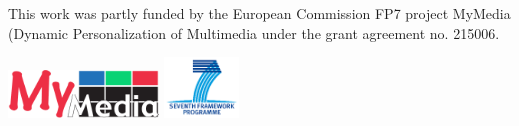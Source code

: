 \documentclass[a4paper, foldmark, 12pt]{leaflet}
\begin{document}
\vspace{0.4cm}

This work was partly funded by the European Commission FP7 project MyMedia
(Dynamic Personalization of Multimedia under the grant agreement no. 215006.

\vspace{0.2cm}

\begin{center}
	\includegraphics[width=4.0cm]{fig/MyMediaLogoMedium.png}
	\hspace{1.5cm}
	\includegraphics[width=2.0cm]{fig/logo-fp7.png}\\
\end{center}
\end{document}
